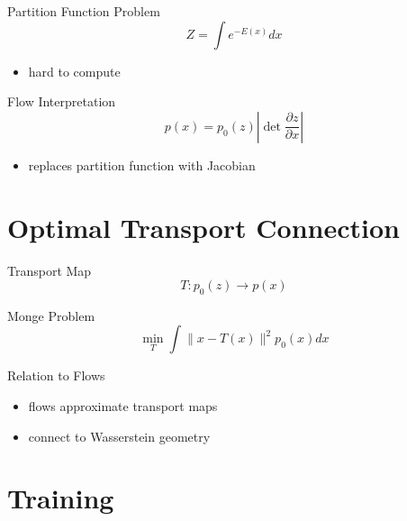 \documentclass{beamer}
\begin{document}

\begin{frame}{Partition Function Problem}
\[
Z = \int e^{-E(x)} dx
\]

\begin{itemize}
\item hard to compute
\end{itemize}
\end{frame}


\begin{frame}{Flow Interpretation}
\[
p(x) = p_0(z)\left|\det \frac{\partial z}{\partial x}\right|
\]

\begin{itemize}
\item replaces partition function with Jacobian
\end{itemize}
\end{frame}

\section{Optimal Transport Connection}

\begin{frame}{Transport Map}
\[
T: p_0(z) \rightarrow p(x)
\]
\end{frame}


\begin{frame}{Monge Problem}
\[
\min_T \int \|x - T(x)\|^2 p_0(x) dx
\]
\end{frame}


\begin{frame}{Relation to Flows}
\begin{itemize}
\item flows approximate transport maps
\item connect to Wasserstein geometry
\end{itemize}
\end{frame}

\section{Training}
\end{document}
